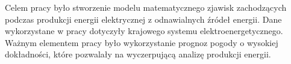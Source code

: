 Celem pracy było stworzenie modelu matematycznego zjawisk zachodzących podczas produkcji energii elektrycznej
z odnawialnych źródeł energii. Dane wykorzystane w pracy dotyczyły krajowego systemu elektroenergetycznego. Ważnym elementem 
pracy było wykorzystanie prognoz pogody o wysokiej dokładności, które pozwalały na wyczerpującą analizę produkcji energii.
